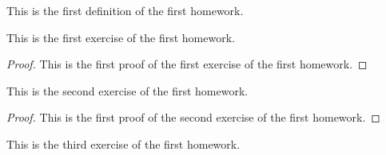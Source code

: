 \begin{definition}
    This is the first definition of the first homework.
\end{definition}
\begin{exercise}\label{ex:H.1.1}
    This is the first exercise of the first homework.
\end{exercise}
\begin{proof}
    This is the first proof of the first exercise of the first homework.
\end{proof}

\begin{exercise}\label{ex:H.1.2}
    This is the second exercise of the first homework.
\end{exercise}

\begin{proof}
    This is the first proof of the second exercise of the first homework.
\end{proof}

\begin{exercise}\label{ex:H.1.3}
    This is the third exercise of the first homework.
\end{exercise}